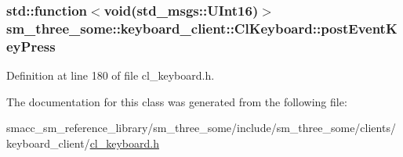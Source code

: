 \subsubsection[{\texorpdfstring{post\+Event\+Key\+Press}{postEventKeyPress}}]{\setlength{\rightskip}{0pt plus 5cm}std\+::function$<$void(std\+\_\+msgs\+::\+U\+Int16)$>$ sm\+\_\+three\+\_\+some\+::keyboard\+\_\+client\+::\+Cl\+Keyboard\+::post\+Event\+Key\+Press}\hypertarget{classsm__three__some_1_1keyboard__client_1_1ClKeyboard_a36efb98dcd78795abf90c9fb00a9f170}{}\label{classsm__three__some_1_1keyboard__client_1_1ClKeyboard_a36efb98dcd78795abf90c9fb00a9f170}


Definition at line 180 of file cl\+\_\+keyboard.\+h.



The documentation for this class was generated from the following file\+:\begin{DoxyCompactItemize}
\item 
smacc\+\_\+sm\+\_\+reference\+\_\+library/sm\+\_\+three\+\_\+some/include/sm\+\_\+three\+\_\+some/clients/keyboard\+\_\+client/\hyperlink{cl__keyboard_8h}{cl\+\_\+keyboard.\+h}\end{DoxyCompactItemize}
